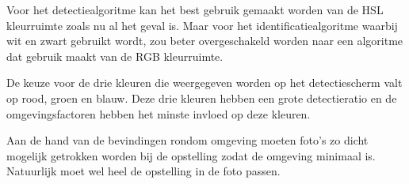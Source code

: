 Voor het detectiealgoritme kan het best gebruik gemaakt worden van de HSL kleurruimte zoals nu al het geval is. Maar voor het identificatiealgoritme waarbij wit en zwart gebruikt wordt, zou beter overgeschakeld worden naar een algoritme dat gebruik maakt van de RGB kleurruimte.

De keuze voor de drie kleuren die weergegeven worden op het detectiescherm valt op rood, groen en blauw. Deze drie kleuren hebben een grote detectieratio en de omgevingsfactoren hebben het minste invloed op deze kleuren.

Aan de hand van de bevindingen rondom omgeving moeten foto's zo dicht mogelijk getrokken worden bij de opstelling zodat de omgeving minimaal is. Natuurlijk moet wel heel de opstelling in de foto passen.

